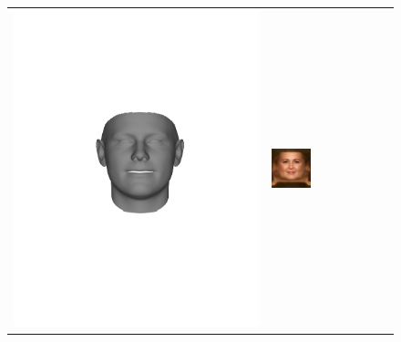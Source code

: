 \begin{figure}[t!]
\begin{center}
\begin{tabular}{ @{\hskip 1.5mm}c@{}c@{\hskip 1.5mm}c@{}c@{}c@{}c@{}c@{\hskip 1.5mm}c@{}}
\includegraphics[trim=150 250 150 250,clip, width=\afifthcolumn]{img/representation/pred_shape_Chubby.pdf} &
\includegraphics[width=\afifthcolumn]{img/representation/pred_tex_Smiling.jpg} &

\end{tabular}
\end{center}
\end{figure}
